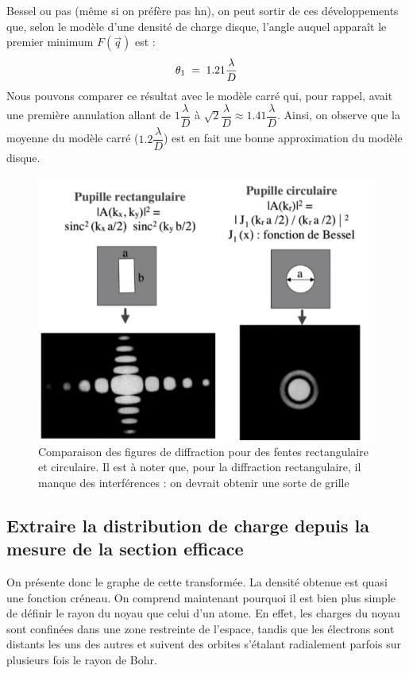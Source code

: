 Bessel ou pas (même si on préfère pas hn), on peut sortir de ces développements que, selon le modèle d'une densité de charge disque, l'angle auquel apparaît le premier minimum $F(\vec{q})$ est :
\[
    \theta_1 \; = \; 1.21\dfrac{\lambda}{D}
\]
Nous pouvons comparer ce résultat avec le modèle carré qui, pour rappel, avait une première annulation allant de $1\dfrac{\lambda}{D}$ à $\sqrt{2}\dfrac{\lambda}{D}\approx 1.41\dfrac{\lambda}{D}$. Ainsi, on observe que la moyenne du modèle carré ($1.2\dfrac{\lambda}{D}$) est en fait une bonne approximation du modèle disque.
\begin{figure}[H]
    \centering
    \includegraphics[scale=0.6]{Images4/ComparaisonFente.PNG}
    \caption{Comparaison des figures de diffraction pour des fentes rectangulaire et circulaire. Il est à noter que, pour la diffraction rectangulaire, il manque des interférences : on devrait obtenir une sorte de grille}
    \label{fig:Comparaison fente}
\end{figure}





\subsection{Extraire la distribution de charge depuis la mesure de la section efficace}




On présente donc le graphe de cette transformée. La densité obtenue est quasi une fonction créneau. On comprend maintenant pourquoi il est bien plus simple de définir le rayon du noyau que celui d'un atome. En effet, les charges du noyau sont confinées dans une zone restreinte de l'espace, tandis que les électrons sont distants les uns des autres et suivent des orbites s'étalant radialement parfois sur plusieurs fois le rayon de Bohr.




